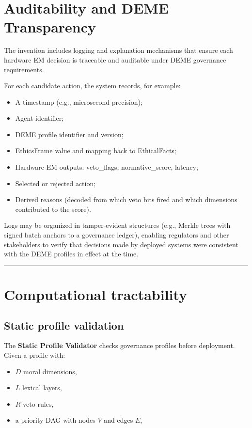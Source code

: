 \documentclass[11pt]{article}
\begin{document}
\section{Auditability and DEME Transparency}

The invention includes logging and explanation mechanisms that ensure each hardware EM decision is traceable and auditable under DEME governance requirements.

For each candidate action, the system records, for example:

\begin{itemize}
  \item A timestamp (e.g., microsecond precision);
  \item Agent identifier;
  \item DEME profile identifier and version;
  \item EthicsFrame value and mapping back to EthicalFacts;
  \item Hardware EM outputs: veto\_flags, normative\_score, latency;
  \item Selected or rejected action;
  \item Derived reasons (decoded from which veto bits fired and which dimensions contributed to the score).
\end{itemize}

Logs may be organized in tamper-evident structures (e.g., Merkle trees with signed batch anchors to a governance ledger), enabling regulators and other stakeholders to verify that decisions made by deployed systems were consistent with the DEME profiles in effect at the time.

\hrule
\vspace{1em}

\section{Computational tractability}

\subsection{Static profile validation}

The \textbf{Static Profile Validator} checks governance profiles before deployment. Given a profile with:

\begin{itemize}
  \item $D$ moral dimensions,
  \item $L$ lexical layers,
  \item $R$ veto rules,
  \item a priority DAG with nodes $V$ and edges $E$,
\end{itemize}
\end{document}
